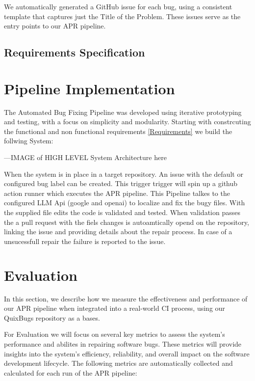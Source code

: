We automatically generated a GitHub issue for each bug, using a consistent template that captures just the Title of the Problem. These issues serve as the entry points to our APR pipeline.

\subsection{Requirements Specification}

\section{Pipeline Implementation}
The Automated Bug Fixing Pipeline was developed using iterative prototyping and testing, with a focus on simplicity and modularity. Starting with constrcuting the functional and non functional requirements \ref{Requirements} we build the follwing System:

---IMAGE of HIGH LEVEL System Architecture here

When the system is in place in a target repository. An issue with the default or configured bug label can be created. This trigger trigger will spin up a github action runner which executes the APR pipeline. This Pipeline talkes to the configured LLM Api (google and openai) to localize and fix the bugy files. With the supplied file edits the code is validated and tested. When validation passes the a pull request with the fiels changes is autoamtically opend on the repository, linking the issue and providing details about the repair process. In case of a unsucessfull repair the failure is reported to the issue.


\section{Evaluation}

In this section, we describe how we measure the effectiveness and performance of our APR pipeline when integrated into a real-world CI process, using our QuixBugs repository as a bases.

For Evaluation we will focus on several key metrics to assess the system's performance and abilites in repairing software bugs. These metrics will provide insights into the system's efficiency, reliability, and overall impact on the software development lifecycle. The following metrics are automatically collected and calculated for each run of the APR pipeline:


